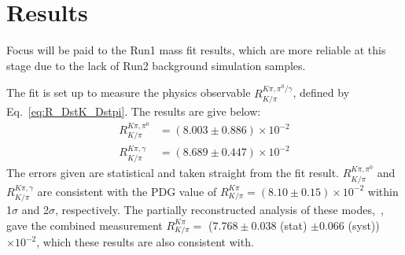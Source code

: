 \documentclass[oneside,12pt]{article}
\begin{document}
\section{Results} \label{sec:results}
\setlength{\abovedisplayskip}{2pt}
\setlength{\belowdisplayskip}{3pt}
\begin{table}[]
   \caption{{Signal yields and errors extracted from the 2D fit results for Run1,
  then 2011-2017 data.}} \label{table:yields}
\end{table}

Focus will be paid to the Run1 mass fit results, which are more reliable at
this stage due to the lack of Run2 background simulation samples.

The fit is set up to measure the physics observable $R^{K\pi , \pi^0
/\gamma}_{K/\pi}$, defined by Eq.~\eqref{eq:R_DstK_Dstpi}. The results are give
below:
\begin{align*}
  R^{K\pi , \pi^0}_{K/\pi} &= (8.003 \pm 0.886) \times 10^{-2} \\
  R^{K\pi , \gamma}_{K/\pi} &= (8.689 \pm 0.447) \times 10^{-2} 
\end{align*} 
The errors given are statistical and taken straight from the fit result.
$R^{K\pi , \pi^0}_{K/\pi}$ and $R^{K\pi , \gamma}_{K/\pi}$ are consistent with
the PDG value of $R^{K\pi}_{K/\pi} = (8.10 \pm 0.15) \times 10^{-2}$ within
1$\sigma$ and 2$\sigma$, respectively. The partially reconstructed analysis of
these modes,~\cite{PartReco}, gave the combined measurement $R^{K\pi}_{K/\pi}
=$ ($7.768 \pm 0.038$ (stat) $\pm 0.066$ (syst)) $\times 10^{-2}$, which these
results are also consistent with. 
\end{document}
